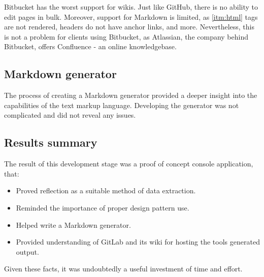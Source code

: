 Bitbucket has the worst support for wikis.
Just like GitHub, there is no ability to edit pages in bulk.
Moreover, support for Markdown is limited, as \ref{itm:html} tags are not rendered, headers do not have anchor links, and more.
Nevertheless, this is not a problem for clients using Bitbucket, as Atlassian, the company behind Bitbucket, offers Confluence - an online knowledgebase.

\subsection{Markdown generator}

The process of creating a Markdown generator provided a deeper insight into the capabilities of the text markup language. Developing the generator was not complicated and did not reveal any issues.

\subsection{Results summary}

The result of this development stage was a proof of concept console application, that:
\begin{itemize}
    \item Proved reflection as a suitable method of data extraction.
    \item Reminded the importance of proper design pattern use.
    \item Helped write a Markdown generator.
    \item Provided understanding of GitLab and its wiki for hosting the tools generated output.
\end{itemize}

Given these facts, it was undoubtedly a useful investment of time and effort.